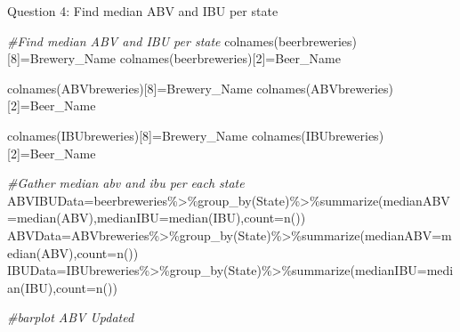 \documentclass[
]{article}
\newenvironment{Shaded}{\begin{snugshade}}{\end{snugshade}}
\newcommand{\AttributeTok}[1]{\textcolor[rgb]{0.77,0.63,0.00}{#1}}
\newcommand{\CommentTok}[1]{\textcolor[rgb]{0.56,0.35,0.01}{\textit{#1}}}
\newcommand{\DecValTok}[1]{\textcolor[rgb]{0.00,0.00,0.81}{#1}}
\newcommand{\FunctionTok}[1]{\textcolor[rgb]{0.00,0.00,0.00}{#1}}
\newcommand{\NormalTok}[1]{#1}
\newcommand{\OtherTok}[1]{\textcolor[rgb]{0.56,0.35,0.01}{#1}}
\newcommand{\SpecialCharTok}[1]{\textcolor[rgb]{0.00,0.00,0.00}{#1}}
\newcommand{\StringTok}[1]{\textcolor[rgb]{0.31,0.60,0.02}{#1}}
\begin{document}
Question 4: Find median ABV and IBU per state

\begin{Shaded}
\begin{Highlighting}[]
\CommentTok{\#Find median ABV and IBU per state}
\FunctionTok{colnames}\NormalTok{(beerbreweries)[}\DecValTok{8}\NormalTok{]}\OtherTok{=}\StringTok{\textquotesingle{}Brewery\_Name\textquotesingle{}}
\FunctionTok{colnames}\NormalTok{(beerbreweries)[}\DecValTok{2}\NormalTok{]}\OtherTok{=}\StringTok{\textquotesingle{}Beer\_Name\textquotesingle{}}

\FunctionTok{colnames}\NormalTok{(ABVbreweries)[}\DecValTok{8}\NormalTok{]}\OtherTok{=}\StringTok{\textquotesingle{}Brewery\_Name\textquotesingle{}}
\FunctionTok{colnames}\NormalTok{(ABVbreweries)[}\DecValTok{2}\NormalTok{]}\OtherTok{=}\StringTok{\textquotesingle{}Beer\_Name\textquotesingle{}}

\FunctionTok{colnames}\NormalTok{(IBUbreweries)[}\DecValTok{8}\NormalTok{]}\OtherTok{=}\StringTok{\textquotesingle{}Brewery\_Name\textquotesingle{}}
\FunctionTok{colnames}\NormalTok{(IBUbreweries)[}\DecValTok{2}\NormalTok{]}\OtherTok{=}\StringTok{\textquotesingle{}Beer\_Name\textquotesingle{}}


\CommentTok{\#Gather median abv and ibu per each state}
\NormalTok{ABVIBUData}\OtherTok{=}\NormalTok{beerbreweries}\SpecialCharTok{\%\textgreater{}\%}\FunctionTok{group\_by}\NormalTok{(State)}\SpecialCharTok{\%\textgreater{}\%}\FunctionTok{summarize}\NormalTok{(}\AttributeTok{medianABV=}\FunctionTok{median}\NormalTok{(ABV),}\AttributeTok{medianIBU=}\FunctionTok{median}\NormalTok{(IBU),}\AttributeTok{count=}\FunctionTok{n}\NormalTok{())}
\NormalTok{ABVData}\OtherTok{=}\NormalTok{ABVbreweries}\SpecialCharTok{\%\textgreater{}\%}\FunctionTok{group\_by}\NormalTok{(State)}\SpecialCharTok{\%\textgreater{}\%}\FunctionTok{summarize}\NormalTok{(}\AttributeTok{medianABV=}\FunctionTok{median}\NormalTok{(ABV),}\AttributeTok{count=}\FunctionTok{n}\NormalTok{())}
\NormalTok{IBUData}\OtherTok{=}\NormalTok{IBUbreweries}\SpecialCharTok{\%\textgreater{}\%}\FunctionTok{group\_by}\NormalTok{(State)}\SpecialCharTok{\%\textgreater{}\%}\FunctionTok{summarize}\NormalTok{(}\AttributeTok{medianIBU=}\FunctionTok{median}\NormalTok{(IBU),}\AttributeTok{count=}\FunctionTok{n}\NormalTok{())}


\CommentTok{\#barplot ABV Updated}


\end{Highlighting}
\end{Shaded}
\end{document}

